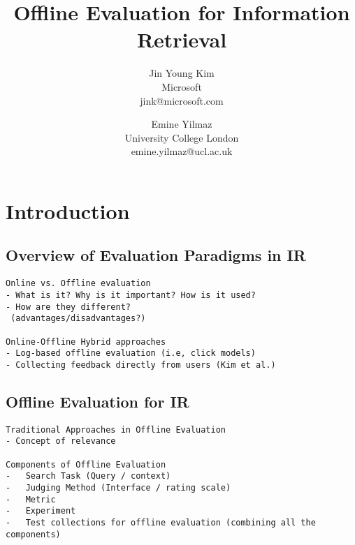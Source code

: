 \documentclass[openany]{now} %
\title{Offline Evaluation for Information Retrieval}
\author{
Jin Young Kim \\
Microsoft \\
jink@microsoft.com
\and
Emine Yilmaz \\
University College London \\
emine.yilmaz@ucl.ac.uk
}
\begin{document}

\frontmatter  %

\maketitle

\tableofcontents

\mainmatter

\begin{abstract}

\end{abstract}

\chapter{Introduction}
\label{c-intro} %

\section{Overview of Evaluation Paradigms in IR}

\begin{verbatim}
Online vs. Offline evaluation
- What is it? Why is it important? How is it used?
- How are they different?
 (advantages/disadvantages?)

Online-Offline Hybrid approaches
- Log-based offline evaluation (i.e, click models)
- Collecting feedback directly from users (Kim et al.)
\end{verbatim}

\cite{INR-XYZ}

\section{Offline Evaluation for IR}

\begin{verbatim}
Traditional Approaches in Offline Evaluation
- Concept of relevance 

Components of Offline Evaluation
-	Search Task (Query / context)
-	Judging Method (Interface / rating scale) 
-	Metric
-	Experiment
-	Test collections for offline evaluation (combining all the components)
\end{verbatim}
\end{document}
